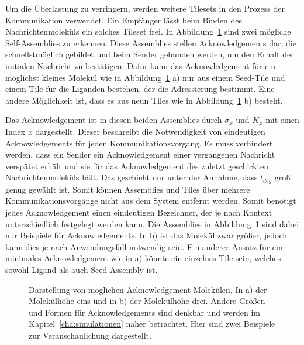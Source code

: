 Um die Überlastung zu verringern, werden weitere Tilesets in den Prozess der Kommunikation verwendet. 
Ein Empfänger lässt beim Binden des Nachrichtenmoleküls ein solches Tileset frei. In Abbildung~\ref{fig:acks} sind zwei mögliche Self-Assemblies zu erkennen. Diese Assemblies stellen Acknowledgements dar, die schnellstmöglich gebildet und beim Sender gebunden werden, um den Erhalt der initialen Nachricht zu bestätigen. 
Dafür kann das Acknowledgement für ein möglichst kleines Molekül wie in Abbildung~\ref{fig:acks} a) nur aus einem Seed-Tile und einem Tile für die Liganden bestehen, der die Adressierung bestimmt. Eine andere Möglichkeit ist, dass es aus neun Tiles wie in Abbildung~\ref{fig:acks} b) besteht. 

Das Acknowledgement ist in diesen beiden Assemblies durch $\sigma_x$ und $K_x$ mit einen Index $x$ dargestellt. Dieser beschreibt die Notwendigkeit von eindeutigen Acknowledgements für jeden Kommunikationsvorgang. 
Es muss verhindert werden, dass ein Sender ein Acknowledgement einer vergangenen Nachricht verspätet erhält und sie für das Acknowledgement des zuletzt geschickten Nachrichtenmoleküls hält.
Das geschieht nur unter der Annahme, dass $t_{deg}$ groß genug gewählt ist. Somit können Assemblies und Tiles über mehrere Kommunikationsvorgänge nicht aus dem System entfernt werden. 
Somit benötigt jedes Acknowledgement einen eindeutigen Bezeichner, der je nach Kontext unterschiedlich festgelegt werden kann.
Die Assemblies in Abbildung~\ref{fig:acks} sind dabei nur Beispiele für Acknowledgements. In b) ist das Molekül zwar größer, jedoch kann dies je nach Anwendungsfall notwendig sein.
Ein anderer Ansatz für ein minimales Acknowledgement wie in a) könnte ein einzelnes Tile sein, welches sowohl Ligand als auch Seed-Assembly ist. 

\begin{figure}
    \centering
    \caption[Acknowledgements Tiles und Moleküle]{Darstellung von möglichen Acknowledgement Molekülen. In a) der Molekülhöhe eins und in b) der Molekülhöhe drei. Andere Größen und Formen für Acknowledgements sind denkbar und werden im Kapitel~\ref{cha:simulationen} näher betrachtet. Hier sind zwei Beispiele zur Veranschaulichung dargestellt.}
    \label{fig:acks}
\end{figure}

